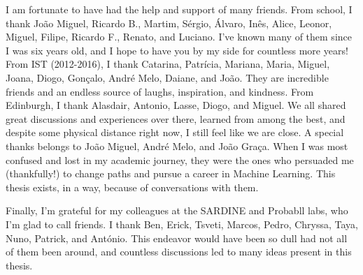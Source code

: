 \begin{acknowledgments}
    I am fortunate to have had the help and support of many friends.
    From school, I thank João Miguel, Ricardo B., Martim, Sérgio,
    Álvaro, Inês, Alice, Leonor, Miguel, Filipe, Ricardo F., Renato,
    and Luciano. I've known many of them since I was six years old,
    and I hope to have you by my side for countless more years! From
    IST (2012-2016), I thank Catarina, Patrícia, Mariana, Maria,
    Miguel, Joana, Diogo, Gonçalo, André Melo, Daiane, and João. They are
    incredible friends and an endless source of laughs, inspiration,
    and kindness. From Edinburgh, I thank Alasdair, Antonio, Lasse,
    Diogo, and Miguel. We all shared great discussions and
    experiences over there, learned from among the best, and despite
    some physical distance right now, I still feel like we are
    close. A special thanks belongs to João Miguel, André Melo, and
    João Graça. When I was most confused and lost in my academic
    journey, they were the ones who persuaded me (thankfully!) to
    change paths and pursue a career in Machine Learning. This thesis
    exists, in a way, because of conversations with them.
    
    Finally, I'm grateful for my colleagues at the SARDINE and
    Probabll labs, who I'm glad to call friends. I thank Ben, Erick,
    Tsveti, Marcos, Pedro, Chryssa, Taya, Nuno, Patrick, and António.
    This endeavor would have been so dull had not all of them been
    around, and countless discussions led to many ideas present in
    this thesis.
    
\end{acknowledgments}
\clearpage
\thispagestyle{empty}
\cleardoublepage

